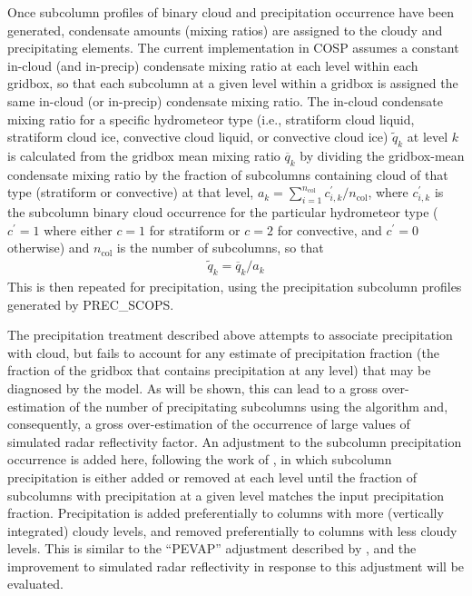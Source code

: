 Once subcolumn profiles of binary cloud and precipitation occurrence
have been generated, condensate amounts (mixing ratios) are assigned to
the cloudy and precipitating elements. The current implementation in
COSP assumes a constant in-cloud (and in-precip) condensate mixing ratio
at each level within each gridbox, so that each subcolumn at a given
level within a gridbox is assigned the same in-cloud (or in-precip)
condensate mixing ratio. The in-cloud condensate mixing ratio for a
specific hydrometeor type (i.e., stratiform cloud liquid, stratiform
cloud ice, convective cloud liquid, or convective cloud ice)
\(\tilde{q}_k\) at level \(k\) is calculated from the gridbox mean
mixing ratio \(\overline{q}_k\) by dividing the gridbox-mean condensate
mixing ratio by the fraction of subcolumns containing cloud of that type
(stratiform or convective) at that level,
\(a_k = \sum_{i = 1}^{n_\textrm{col}} c^\prime_{i, k} / n_\textrm{col}\),
where \(c^{\prime}_{i, k}\) is the subcolumn binary cloud occurrence for
the particular hydrometeor type (\(c^\prime = 1\) where either \(c = 1\)
for stratiform or \(c = 2\) for convective, and \(c^\prime = 0\)
otherwise) and \(n_\textrm{col}\) is the number of subcolumns, so that
\[\begin{gathered} 
    \tilde{q}_k = \overline{q}_k / a_k
\end{gathered}\] This is then repeated for precipitation, using the
precipitation subcolumn profiles generated by PREC\_SCOPS.

The precipitation treatment described above attempts to associate
precipitation with cloud, but fails to account for any estimate of
precipitation fraction (the fraction of the gridbox that contains
precipitation at any level) that may be diagnosed by the model. As will
be shown, this can lead to a gross over-estimation of the number of
precipitating subcolumns using the \citet{zhang_et_al_2010} algorithm
and, consequently, a gross over-estimation of the occurrence of large
values of simulated radar reflectivity factor. An adjustment to the
subcolumn precipitation occurrence is added here, following the work of
\citet{dimichele_et_al_2012}, in which subcolumn precipitation is either
added or removed at each level until the fraction of subcolumns with
precipitation at a given level matches the input precipitation fraction.
Precipitation is added preferentially to columns with more (vertically
integrated) cloudy levels, and removed preferentially to columns with
less cloudy levels. This is similar to the ``PEVAP'' adjustment
described by \citet{dimichele_et_al_2012}, and the improvement to
simulated radar reflectivity in response to this adjustment will be
evaluated.


